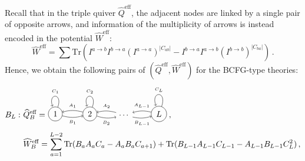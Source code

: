 \documentclass[12pt,a4paper]{article}
\renewcommand{\(}{\left(}
\renewcommand{\)}{\right)}
\renewcommand{\(}{\left(}
\renewcommand{\)}{\right)}
\begin{document}
Recall that in the triple quiver $\widehat{Q}^{\text{eff}}$, the adjacent nodes are linked by a single pair of opposite arrows,
and information of the multiplicity of arrows is instead encoded in the potential $\widehat{W}^{\text{eff}}$:
\begin{equation}
\widehat{W}^{\text{eff}}=\sum\text{Tr}(I^{a\to b}I^{b\to a}(I^{a\to a})^{|C_{ab}|}-I^{b\to a}I^{a\to b}(I^{b\to b})^{|C_{ba}|})\,.
\end{equation}
Hence, we obtain the following pairs of $(\widehat{Q}^{\text{eff}},\widehat{W}^{\text{eff}})$  for the BCFG-type theories:
{\small
\begin{equation}\label{eq:triple_B}
\begin{aligned}
B_L:\ & \widehat{Q}^{\text{eff}}_B=\begin{tikzpicture}[baseline={([yshift=-3ex]current bounding box.center)},vertex/.style={anchor=base,circle,fill=black!25,minimum size=18pt,inner sep=2pt}]
\node (v1) at (-3,0.2)[circle,draw] {1};
\node (v2) at (-1.5,0.2)[circle,draw] {2};
\node (e) at (0,0.15) {$\dots$};
\node (vl) at (1.5,0.2)[circle,draw] {$L$};

\draw[->] (v2) edge [bend right=15] node[above] {{\tiny $A_1$}} (v1);
\draw[->] (v1) edge [bend right=15] node[below] {{\tiny $B_1$}} (v2);
\draw (v1) edge [in=110,out=70,loop] node [above]{{\tiny $C_1$}} (v1);
			
\draw[->] (v2) edge [bend right=15] node[below] {{\tiny $B_2$}} (e);
\draw[->] (e) edge [bend right=15] node[above] {{\tiny $A_2$}} (v2);
\draw (v2) edge [in=110,out=70,loop] node[above] {{\tiny $C_2$}} (v2);
			
\draw[->] (e) edge [bend right=15] node[below] {{\tiny $B_{L-1}$}} (vl);
\draw[->] (vl) edge [bend right=15] node[above] {{\tiny $A_{L-1}$}} (e);
\draw (vl) edge [in=110,out=70,loop] node[above] {{\tiny $C_{L}$}} (vl);
	\end{tikzpicture}\,,\\
&\widehat{W}_B^{\text{eff}}=\sum_{a=1}^{L-2}\text{Tr}(B_aA_aC_a-A_aB_aC_{a+1})+\text{Tr}(B_{L-1}A_{L-1}C_{L-1}-A_{L-1}B_{L-1}C_L^2)\,,
\end{aligned}
\end{equation}}
\end{document}
